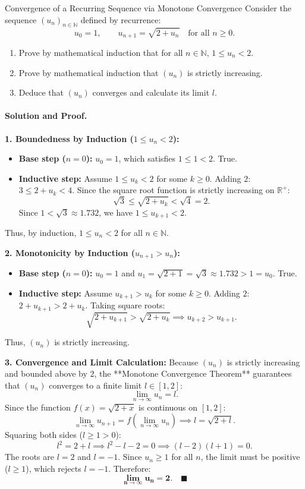 \begin{workedexample}{Convergence of a Recurring Sequence via Monotone Convergence}
Consider the sequence $(u_n)_{n \in \mathbb{N}}$ defined by recurrence:
\[
u_0 = 1, \qquad u_{n+1} = \sqrt{2 + u_n} \quad \text{for all } n \ge 0.
\]
\begin{enumerate}[leftmargin=1.4em,itemsep=2pt]
  \item Prove by mathematical induction that for all $n \in \mathbb{N}$, $1 \le u_n < 2$.
  \item Prove by mathematical induction that $(u_n)$ is strictly increasing.
  \item Deduce that $(u_n)$ converges and calculate its limit $l$.
\end{enumerate}

\paragraph{Solution and Proof.}
\textbf{1. Boundedness by Induction ($1 \le u_n < 2$):}
\begin{itemize}[leftmargin=1.4em,itemsep=2pt]
  \item \textbf{Base step ($n = 0$):} $u_0 = 1$, which satisfies $1 \le 1 < 2$. True.
  \item \textbf{Inductive step:} Assume $1 \le u_k < 2$ for some $k \ge 0$.
  Adding $2$: $3 \le 2 + u_k < 4$.
  Since the square root function is strictly increasing on $\mathbb{R}^+$:
  \[
  \sqrt{3} \le \sqrt{2 + u_k} < \sqrt{4} = 2.
  \]
  Since $1 < \sqrt{3} \approx 1.732$, we have $1 \le u_{k+1} < 2$.
\end{itemize}
Thus, by induction, $1 \le u_n < 2$ for all $n \in \mathbb{N}$.

\textbf{2. Monotonicity by Induction ($u_{n+1} > u_n$):}
\begin{itemize}[leftmargin=1.4em,itemsep=2pt]
  \item \textbf{Base step ($n = 0$):} $u_0 = 1$ and $u_1 = \sqrt{2 + 1} = \sqrt{3} \approx 1.732 > 1 = u_0$. True.
  \item \textbf{Inductive step:} Assume $u_{k+1} > u_k$ for some $k \ge 0$.
  Adding $2$: $2 + u_{k+1} > 2 + u_k$.
  Taking square roots:
  \[
  \sqrt{2 + u_{k+1}} > \sqrt{2 + u_k} \implies u_{k+2} > u_{k+1}.
  \]
\end{itemize}
Thus, $(u_n)$ is strictly increasing.

\textbf{3. Convergence and Limit Calculation:}
Because $(u_n)$ is strictly increasing and bounded above by $2$, the **Monotone Convergence Theorem** guarantees that $(u_n)$ converges to a finite limit $l \in [1, 2]$:
\[
\lim_{n \to \infty} u_n = l.
\]
Since the function $f(x) = \sqrt{2 + x}$ is continuous on $[1, 2]$:
\[
\lim_{n \to \infty} u_{n+1} = f\left( \lim_{n \to \infty} u_n \right) \implies l = \sqrt{2 + l}.
\]
Squaring both sides ($l \ge 1 > 0$):
\[
l^2 = 2 + l \implies l^2 - l - 2 = 0 \implies (l - 2)(l + 1) = 0.
\]
The roots are $l = 2$ and $l = -1$.
Since $u_n \ge 1$ for all $n$, the limit must be positive ($l \ge 1$), which rejects $l = -1$.
Therefore:
\[
\mathbf{\lim_{n \to \infty} u_n = 2}. \quad \blacksquare
\]
\end{workedexample}

